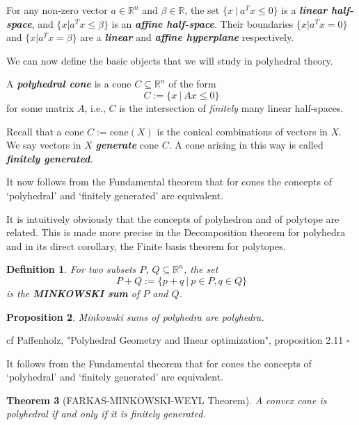 \documentclass{article}
\newcounter{lecnum}
\newtheorem{theorem}{Theorem}[lecnum]
\newtheorem{proposition}[theorem]{Proposition}
\newtheorem{definition}[theorem]{Definition}
\newenvironment{proof}{{\it Proof.}}{ \hfill $\square$}
\def\R{{\mathbb R}}
\begin{document}
For any non-zero vector $a\in\R^n$ and $\beta\in \R$, the set $\{x~|~a^T x\leqslant 0\}$ is a  \emph{\textbf{linear half-space}}, and $\{x|a^T x\leqslant \beta\}$ is an \emph{\textbf{affine half-space}}. Their boundaries $\{x|a^T x=0\}$ and $\{x|a^T x=\beta\}$ are a  \emph{\textbf{linear}} and  \emph{\textbf{affine hyperplane}} respectively.

We can now define the basic objects that we will study in polyhedral theory.

A  \emph{\textbf{polyhedral cone}} is a cone $C\subseteq\R^n$ of the form
\begin{equation*}
C:=\{x~|~Ax\leqslant 0\}
\end{equation*}
for some matrix $A$, i.e., $C$ is the intersection of \emph{finitely} many linear half-spaces. 

Recall that a cone $C:=\mbox{cone}(X)$ is the conical combinations of vectors in $X$. We say vectors in $X$ \emph{\textbf{generate}} cone $C$.
A cone arising in this way is called  \emph{\textbf{finitely generated}}.

It now follows from the Fundamental theorem that for cones the concepts of `polyhedral' and `finitely generated' are equivalent.

It is intuitively obviously that the concepts of polyhedron and of polytope are related. This is made more precise in the Decomposition theorem for polyhedra and in its direct corollary, the Finite basis theorem for polytopes.
\begin{definition} For two subsets $P$, $Q\subseteq \R^n$, the set 
\begin{equation*}
P+Q:=\{p+q~|~p\in P, q\in Q\}
\end{equation*}
is the \emph{\textbf{M{\scriptsize INKOWSKI}  sum}} of $P$ and $Q$.
\end{definition}

\begin{proposition}
Minkowski sums of polyhedra are polyhedra.
\end{proposition}
\begin{proof}
cf Paffenholz, "Polyhedral Geometry and lInear optimization", proposition 2.11
\end{proof}

It follows from the Fundamental theorem that for cones the concepts of `polyhedral' and `finitely generated' are equivalent.

\begin{theorem}[F{\scriptsize ARKAS}-M{\scriptsize INKOWSKI}-W{\scriptsize EYL} Theorem]
A convex cone is polyhedral if and only if it is finitely generated.
\end{theorem}
\end{document}
